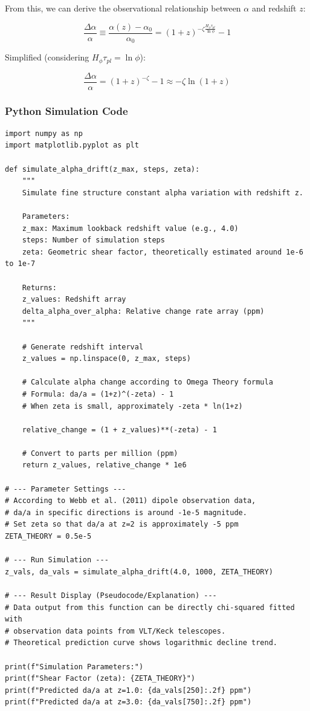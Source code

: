 From this, we can derive the observational relationship between $\alpha$ and redshift $z$:

\[\frac{\Delta \alpha}{\alpha} \equiv \frac{\alpha(z) - \alpha_0}{\alpha_0} = (1+z)^{-\zeta \frac{H_\phi \tau_{pl}}{\ln \phi}} - 1\]

Simplified (considering $H_\phi \tau_{pl} = \ln \phi$):

\[\frac{\Delta \alpha}{\alpha} = (1+z)^{-\zeta} - 1 \approx -\zeta \ln(1+z)\]

\subsubsection{Python Simulation Code}

\begin{verbatim}
import numpy as np
import matplotlib.pyplot as plt

def simulate_alpha_drift(z_max, steps, zeta):
    """
    Simulate fine structure constant alpha variation with redshift z.
    
    Parameters:
    z_max: Maximum lookback redshift value (e.g., 4.0)
    steps: Number of simulation steps
    zeta: Geometric shear factor, theoretically estimated around 1e-6 to 1e-7
    
    Returns:
    z_values: Redshift array
    delta_alpha_over_alpha: Relative change rate array (ppm)
    """
    
    # Generate redshift interval
    z_values = np.linspace(0, z_max, steps)
    
    # Calculate alpha change according to Omega Theory formula
    # Formula: da/a = (1+z)^(-zeta) - 1
    # When zeta is small, approximately -zeta * ln(1+z)
    
    relative_change = (1 + z_values)**(-zeta) - 1
    
    # Convert to parts per million (ppm)
    return z_values, relative_change * 1e6

# --- Parameter Settings ---
# According to Webb et al. (2011) dipole observation data,
# da/a in specific directions is around -1e-5 magnitude.
# Set zeta so that da/a at z=2 is approximately -5 ppm
ZETA_THEORY = 0.5e-5  

# --- Run Simulation ---
z_vals, da_vals = simulate_alpha_drift(4.0, 1000, ZETA_THEORY)

# --- Result Display (Pseudocode/Explanation) ---
# Data output from this function can be directly chi-squared fitted with
# observation data points from VLT/Keck telescopes.
# Theoretical prediction curve shows logarithmic decline trend.

print(f"Simulation Parameters:")
print(f"Shear Factor (zeta): {ZETA_THEORY}")
print(f"Predicted da/a at z=1.0: {da_vals[250]:.2f} ppm")
print(f"Predicted da/a at z=3.0: {da_vals[750]:.2f} ppm")
\end{verbatim}


